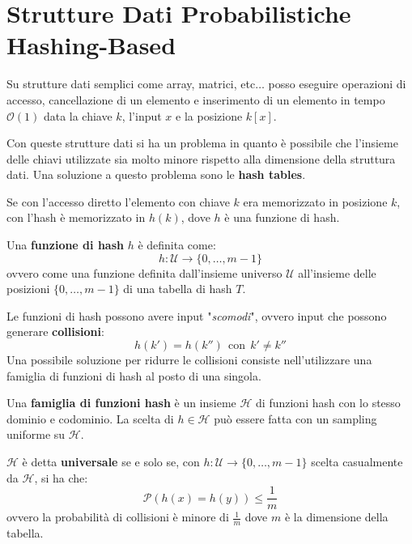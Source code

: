\chapter{Strutture Dati Probabilistiche Hashing-Based}
Su strutture dati semplici come array, matrici, etc$\dots$ posso eseguire operazioni
di accesso, cancellazione di un elemento e inserimento di un elemento in tempo
$\mathcal{O}(1)$ data la chiave $k$, l'input $x$ e la posizione $k[x]$.

Con queste strutture dati si ha un problema in quanto è possibile che l'insieme
delle chiavi utilizzate sia molto minore rispetto alla dimensione della struttura
dati. Una soluzione a questo problema sono le \textbf{hash tables}.

Se con l'accesso diretto l'elemento con chiave $k$ era memorizzato in posizione
$k$, con l'hash è memorizzato in $h(k)$, dove $h$ è una funzione di hash.
\begin{definizione}
    Una \textbf{funzione di hash} $h$ è definita come:
    \begin{equation}
        h: \mathcal{U} \to \{0, \dots, m - 1\}
    \end{equation}
    ovvero come una funzione definita dall'insieme universo $\mathcal{U}$
    all'insieme delle posizioni $\{0, \dots, m - 1\}$ di una tabella di hash $T$.
\end{definizione}
Le funzioni di hash possono avere input "\textit{scomodi}", ovvero input che
possono generare \textbf{collisioni}:
\begin{equation}
    h(k') = h(k'') \ \ \text{con} \ \ k' \neq k''
\end{equation}
Una possibile soluzione per ridurre le collisioni consiste nell'utilizzare una
famiglia di funzioni di hash al posto di una singola.
\begin{definizione}
    Una \textbf{famiglia di funzioni hash} è un insieme $\mathcal{H}$ di funzioni
    hash con lo stesso dominio e codominio. La scelta di $h \in \mathcal{H}$ può
    essere fatta con un sampling uniforme su $\mathcal{H}$.
\end{definizione}
$\mathcal{H}$ è detta \textbf{universale} se e solo se, con $h : \mathcal{U} \to
    \{0, \dots, m - 1\}$ scelta casualmente da $\mathcal{H}$, si ha che:
\begin{equation}
    \mathcal{P}(h(x) = h(y)) \leq \frac{1}{m}
\end{equation}
ovvero la probabilità di collisioni è minore di $\frac{1}{m}$ dove $m$ è la
dimensione della tabella.

